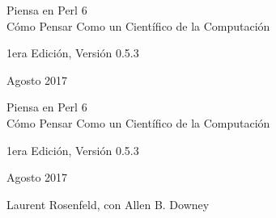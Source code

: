 \documentclass[10pt]{book}
\newcommand{\theversion}{1era Edición, Versión 0.5.3}
\newcommand{\thedate}{Agosto 2017}
\begin{document}
\begin{latexonly}

\renewcommand{\blankpage}{\thispagestyle{empty} \quad \newpage}



\thispagestyle{empty}

\begin{flushright}
\vspace*{2.0in}

\begin{spacing}{3}
{\huge Piensa en Perl 6}\\
{\Large Cómo Pensar Como un Científico de la Computación}
\end{spacing}

\vspace{0.25in}

\theversion

\thedate

\vfill

\end{flushright}


\blankpage
\blankpage

\pagebreak
\thispagestyle{empty}

\begin{flushright}
\vspace*{2.0in}

\begin{spacing}{3}
{\huge Piensa en Perl 6}\\
{\Large Cómo Pensar Como un Científico de la Computación}
\end{spacing}

\vspace{0.25in}

\theversion

\thedate

\vspace{1in}


{\Large
Laurent Rosenfeld,
con Allen B. Downey\\
}


\vspace{0.5in}


\end{flushright}
\end{latexonly}
\end{document}
